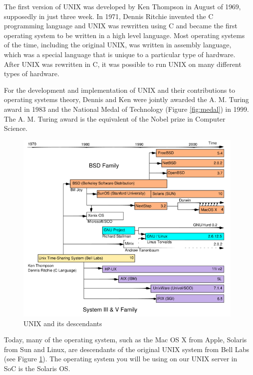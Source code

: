 The first version of UNIX was developed by Ken Thompson in August of 1969,
supposedly in just three week. In 1971, Dennis Ritchie invented the C
programming language and UNIX was rewritten using C and became the first
operating system to be written in a high level language. Most operating systems
of the time, including the original UNIX, was written in assembly language,
which was a special language that is unique to a particular type of hardware.
After UNIX was rewritten in C, it was possible to run UNIX on many different
types of hardware.     

For the development and implementation of UNIX and their contributions to
operating systems theory, Dennis and Ken were jointly awarded the A. M. Turing
award in 1983 and the National Medal of Technology (Figure \ref{fig:medal}) in
1999. The A. M. Turing award is the equivalent of the Nobel prize in Computer
Science.  

\begin{frame}
\begin{figure}
\begin{center}\includegraphics[width=0.7\linewidth]{unix_timeline}\end{center}
\caption{UNIX and its descendants}
\label{fig:timeline}
\end{figure}
\end{frame}

Today, many of the operating system, such as the Mac OS X from Apple, Solaris
from Sun and Linux, are descendants of the original UNIX system from Bell Labs
(see Figure \ref{fig:timeline}). The operating system you will be using on our
UNIX server in SoC is the Solaris OS.

